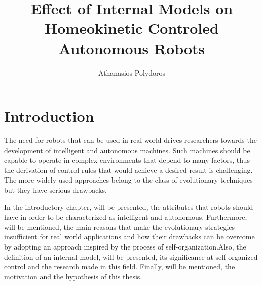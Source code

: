 \documentclass[msc,ai,logo]{infthesis}
\title{Effect of Internal Models on Homeokinetic Controled  Autonomous Robots}
\author{Athanasios Polydoros}
\begin{document}
\begin{preliminary}

\maketitle

\begin{acknowledgements}

\end{acknowledgements}

\standarddeclaration


\tableofcontents


\end{preliminary}

\chapter{Introduction}
\label{ch:In}
The need for robots that can be used in real world drives researchers towards the development of intelligent and autonomous machines. Such machines should be capable to operate in complex environments that depend to many factors, thus the derivation of control rules that would achieve a desired result is challenging. The more widely used approaches belong to the class of evolutionary techniques \citep{nolfi2000evolutionary} but they have serious drawbacks.

 In the introductory chapter, will be presented, the attributes that robots should have in order to be characterized as intelligent and autonomous. Furthermore, will be mentioned, the main reasons that make the evolutionary strategies insufficient for real world applications and how their drawbacks can be overcome by adopting an approach inspired by the process of self-organization.Also, the definition of an internal model, will be presented, its significance at self-organized control and the research made in this field. Finally, will be mentioned, the motivation and the hypothesis of this thesis.
\end{document}
